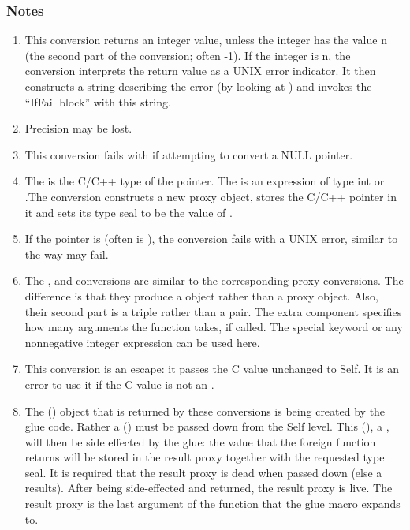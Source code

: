 \documentclass[letterpaper,10pt,english]{sphinxmanual}
\begin{document}
\subsubsection{Notes}
\label{\detokenize{vmref:id3}}\begin{enumerate}
\item {} 
This conversion returns an integer value, unless the integer has the value n (the second part of
the conversion; often -1). If the integer is n, the conversion interprets the return value as a UNIX
error indicator. It then constructs a string describing the error (by looking at ) and invokes
the “IfFail block” with this string.

\item {} 
Precision may be lost.

\item {} 
This conversion fails with  if attempting to convert a NULL pointer.

\item {} 
The  is the C/C++ type of the pointer. The  is an expression of type int
or .The conversion constructs a new proxy object, stores the C/C++ pointer in it and sets
its type seal to be the value of .

\item {} 
If the pointer is  (often  is ), the conversion fails with a UNIX error, similar to the way
 may fail.

\item {} 
The ,  and  conversions are similar to
the corresponding proxy conversions. The difference is that they produce a  object rather
than a proxy object. Also, their second part is a triple rather than a pair. The extra component
specifies how many arguments the function takes, if called. The special keyword 
or any nonnegative integer expression can be used here.

\item {} 
This conversion is an escape: it passes the C value unchanged to Self. It is an error to use it if
the C value is not an .

\item {} 
The  () object that is returned by these conversions is  being created by the
glue code. Rather a  () must be passed down from the Self level. This 
(), a , will then be side effected by the glue: the value that the foreign function
returns will be stored in the result proxy together with the requested type seal. It is required
that the result proxy is dead when passed down (else a  results). After being
side-effected and returned, the result proxy is live. The result proxy is the last argument of the
function that the glue macro expands to.


\end{enumerate}
\end{document}
